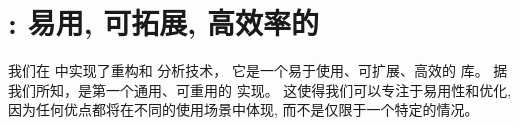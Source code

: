\section{\egg: 易用, 可拓展, 高效率的 \Egraphs}

\label{sec:egg}
\label{sec:impl}
\label{sec:lambda}

我们在 \egg 中实现了重构和 \eclass 分析技术，
  它是一个易于使用、可扩展、高效的 \egraph 库。
据我们所知，\egg 是第一个通用、可重用的 \egraph 实现。
这使得我们可以专注于易用性和优化,
  因为任何优点都将在不同的使用场景中体现,
  而不是仅限于一个特定的情况。

